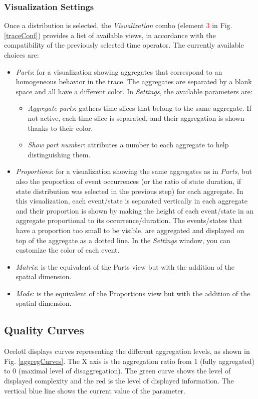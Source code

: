 \documentclass[twoside]{article}
\begin{document}
\begin{sloppypar}
\subsubsection{Visualization Settings}
Once a distribution is selected, the \textit{Visualization} combo (element \textcolor{red}{3} in Fig. \ref{traceConf}) provides a list of available views, in accordance with the compatibility of the previously selected time operator. The currently available choices are:
\begin{itemize}
	\item \textit{Parts}: for a visualization showing aggregates that correspond to an homogeneous behavior in the trace. The aggregates are separated by a blank space and all have a different color. In \textit{Settings}, the available parameters are:
	\begin{itemize}
		\item \textit{Aggregate parts}: gathers time slices that belong to the same aggregate. If not active, each time slice is separated, and their aggregation is shown thanks to their color.
		\item \textit{Show part number}: attributes a number to each aggregate to help distinguishing them.
	\end{itemize}
	\item \textit{Proportions}: for a visualization showing the same aggregates as in \textit{Parts}, but also the proportion of event occurrences (or the ratio of state duration, if state distribution was selected in the previous step) for each aggregate. In this visualization, each event/state is separated vertically in each aggregate and their proportion is shown by making the height of each event/state in an aggregate proportional to its occurrence/duration. The events/states that have a proportion too small to be visible, are aggregated and displayed on top of the aggregate as a dotted line. In the \textit{Settings} window, you can customize the color of each event.
	\item \textit{Matrix}: is the equivalent of the Parts view but with the addition of the spatial dimension.
	\item \textit{Mode}: is the equivalent of the Proportions view but with the addition of the spatial dimension.
\end{itemize}

\subsection{Quality Curves}
Ocelotl displays curves representing the different aggregation levels, as shown in Fig. \ref{aggregCurves}. The X axis is the aggregation ratio from 1 (fully aggregated) to 0 (maximal level of disaggregation). %
The green curve shows the level of displayed complexity and the red is the level of displayed information. 
The vertical blue line shows the current value of the parameter.


\end{sloppypar}
\end{document}
